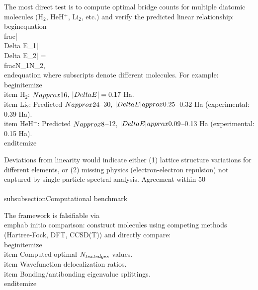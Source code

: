 \documentclass[aps,prd,twocolumn,superscriptaddress,groupedaddress,showpacs]{revtex4-2}
\begin{document}
The most direct test is to compute optimal bridge counts for multiple diatomic molecules (H$_2$, HeH$^+$, Li$_2$, etc.) and verify the predicted linear relationship:
\\begin{equation}
\\frac{|\\Delta E_1|}{|\\Delta E_2|} = \\frac{N_1}{N_2},
\\end{equation}
where subscripts denote different molecules. For example:
\\begin{itemize}
\\item H$_2$: $N \\approx 16$, $|\\Delta E| = 0.17$ Ha.
\\item Li$_2$: Predicted $N \\approx 24$--30, $|\\Delta E| \\approx 0.25$--0.32 Ha (experimental: 0.39 Ha).
\\item HeH$^+$: Predicted $N \\approx 8$--12, $|\\Delta E| \\approx 0.09$--0.13 Ha (experimental: 0.15 Ha).
\\end{itemize}

Deviations from linearity would indicate either (1) lattice structure variations for different elements, or (2) missing physics (electron-electron repulsion) not captured by single-particle spectral analysis. Agreement within 50\\%

\\subsubsection{Computational benchmark}

The framework is falsifiable via \\emph{ab initio} comparison: construct molecules using competing methods (Hartree-Fock, DFT, CCSD(T)) and directly compare:
\\begin{itemize}
\\item Computed optimal $N_{\\text{edges}}$ values.
\\item Wavefunction delocalization ratios.
\\item Bonding/antibonding eigenvalue splittings.
\\end{itemize}
\end{document}
